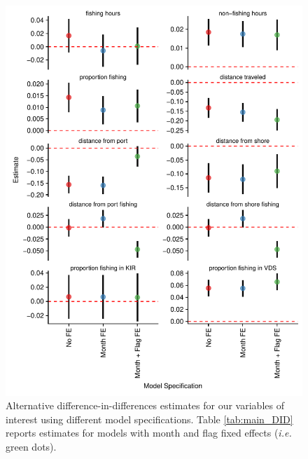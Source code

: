 \documentclass[11pt,english]{article}
\begin{document}
\begin{figure}
\centering
\includegraphics{img/other_specifications.pdf}
\caption{\label{fig:other_specifications}Alternative difference-in-differences estimates
for our variables of interest using different model specifications. Table \ref{tab:main_DID}
reports estimates for models with month and flag fixed effects (\emph{i.e.} green dots).}
\end{figure}
\end{document}
